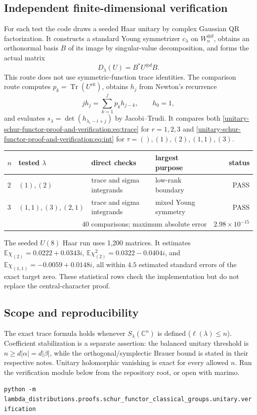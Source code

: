\documentclass[10pt]{article}
\newcommand{\Tr}{\operatorname{Tr}}
\begin{document}
\subsection{Independent finite-dimensional verification}
For each test the code draws a seeded Haar unitary by complex Gaussian QR factorization. It constructs a standard Young symmetrizer $c_\lambda$ on $W_n^{\otimes d}$, obtains an orthonormal basis $B$ of its image by singular-value decomposition, and forms the actual matrix
\begin{equation}
 D_\lambda(U)=B^*U^{\otimes d}B.
\end{equation}
This route does not use symmetric-function trace identities. The comparison route computes $p_k=\Tr(U^{rk})$, obtains $h_j$ from Newton's recurrence
\begin{equation}
 jh_j=\sum_{k=1}^j p_kh_{j-k},\qquad h_0=1,
\end{equation}
and evaluates $s_\lambda=\det(h_{\lambda_i-i+j})$ by Jacobi--Trudi. It compares both \eqref{unitary-schur-functor-proof-and-verification:eq:trace} for $r=1,2,3$ and \eqref{unitary-schur-functor-proof-and-verification:eq:int} for $\tau=(),(1),(2),(1,1),(3)$.

\begin{center}\begin{tabular}{@{}llllr@{}}\toprule
$n$ & tested $\lambda$ & direct checks & largest purpose & status\\\midrule
2 & $(1),(2)$ & trace and sigma integrands & low-rank boundary & PASS\\
3 & $(1,1),(3),(2,1)$ & trace and sigma integrands & mixed Young symmetry & PASS\\\midrule
\multicolumn{4}{r}{40 comparisons; maximum absolute error} & $2.98\times10^{-15}$\\\bottomrule
\end{tabular}\end{center}

\clearpage
The seeded $U(8)$ Haar run uses 1,200 matrices. It estimates $\mathbb E\chi_{(2)}=0.0222+0.0343i$, $\mathbb E\chi_{(2)}^2=0.0322-0.0404i$, and $\mathbb E\chi_{(1,1)}=-0.0059+0.0148i$, all within $4.5$ estimated standard errors of the exact target zero. These statistical rows check the implementation but do not replace the central-character proof.

\subsection{Scope and reproducibility}
The exact trace formula holds whenever $S_\lambda(\mathbb C^n)$ is defined ($\ell(\lambda)\le n$). Coefficient stabilization is a separate assertion: the balanced unitary threshold is $n\geq d|\alpha|=d|\beta|$, while the orthogonal/symplectic Brauer bound is stated in their respective notes.  Unitary holomorphic vanishing is exact for every allowed $n$. Run the verification module below from the repository root, or open  with marimo.
\begin{center}\footnotesize\texttt{python -m lambda\_distributions.proofs.schur\_functor\_classical\_groups.unitary.verification}\end{center}
\end{document}
